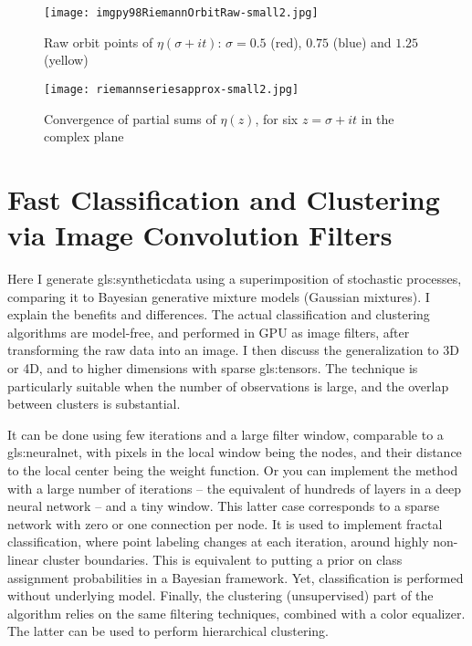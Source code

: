 \documentclass[oneside,10pt]{book}
\newcommand\Chapter[2]{
  \chapter[#1]{#1\\[2ex]\Large\itshape#2}
}
\begin{document}
\begin{figure}[H]
\centering
\texttt{[image: imgpy98RiemannOrbitRaw-small2.jpg]}
\caption{Raw orbit points of $\eta(\sigma + it)$: $\sigma=0.5$ (red), $0.75$ (blue) and $1.25$ (yellow)}
\label{fig:orbit102b}
\end{figure}


\begin{figure}[H]
\centering
\texttt{[image: riemannseriesapprox-small2.jpg]}
\caption{Convergence of partial sums of $\eta(z)$, for six $z=\sigma+it$ in the complex plane}
\label{fig:orbit103}
\end{figure}

\Chapter{Fast Classification and Clustering via Image Convolution Filters}{}\label{chapterfastclassif}

Here I generate \gls{gls:syntheticdata} using a superimposition of stochastic processes, comparing it to Bayesian generative mixture models (Gaussian mixtures). I explain the benefits and differences. The actual classification and clustering algorithms are model-free, and performed in GPU as image filters, after transforming the raw data into an image. I then discuss the generalization to 3D or 4D, and to higher dimensions with sparse \glspl{gls:tensor}. The technique is particularly suitable when the number of observations is large, and the overlap between clusters is substantial. 

It can be done using few iterations and a large filter window, comparable to a \gls{gls:neuralnet}, with pixels in the local window being the nodes, and their distance to the local center being the weight function. Or you can implement the method with a large number of iterations -- the equivalent of hundreds of layers in a deep neural network -- and a tiny window. This latter case corresponds to a 
\textcolor{index}{sparse network} with zero or one connection per node. It is used to implement fractal classification, where point labeling changes at each iteration, around highly non-linear cluster boundaries. This is equivalent to putting a prior on class assignment probabilities in a Bayesian framework. Yet, classification is performed without underlying model. Finally, the clustering (unsupervised) part of the algorithm relies on the same filtering techniques, combined with a color equalizer. The latter can be used to perform hierarchical clustering. 
\end{document}
